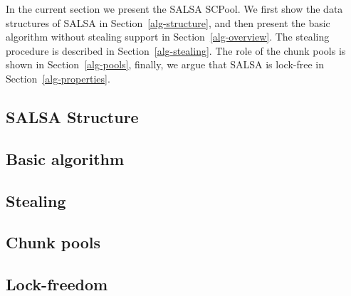 In the current section we present the SALSA SCPool. We first show the data structures of SALSA in Section~\ref{alg-structure}, and then present the basic algorithm without stealing support in Section~\ref{alg-overview}. The stealing procedure is described in Section~\ref{alg-stealing}. The role of the chunk pools is shown in Section~\ref{alg-pools}, finally, we argue that SALSA is lock-free in Section~\ref{alg-properties}. 

\subsection{SALSA Structure\label{alg-structure}}

\subsection{Basic algorithm\label{alg-overview}}

\subsection{Stealing\label{alg-stealing}}

\subsection{Chunk pools\label{alg-pools}}

\subsection{Lock-freedom\label{alg-properties}}

